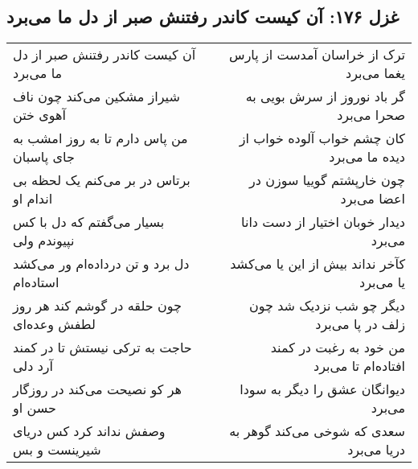 \begin{center}
\section*{غزل ۱۷۶: آن کیست کاندر رفتنش صبر از دل ما می‌برد}
\label{sec:176}
\begin{longtable}{l p{0.5cm} r}
آن کیست کاندر رفتنش صبر از دل ما می‌برد
&&
ترک از خراسان آمدست از پارس یغما می‌برد
\\
شیراز مشکین می‌کند چون ناف آهوی ختن
&&
گر باد نوروز از سرش بویی به صحرا می‌برد
\\
من پاس دارم تا به روز امشب به جای پاسبان
&&
کان چشم خواب آلوده خواب از دیده ما می‌برد
\\
برتاس در بر می‌کنم یک لحظه بی اندام او
&&
چون خارپشتم گوییا سوزن در اعضا می‌برد
\\
بسیار می‌گفتم که دل با کس نپیوندم ولی
&&
دیدار خوبان اختیار از دست دانا می‌برد
\\
دل برد و تن درداده‌ام ور می‌کشد استاده‌ام
&&
کآخر نداند بیش از این یا می‌کشد یا می‌برد
\\
چون حلقه در گوشم کند هر روز لطفش وعده‌ای
&&
دیگر چو شب نزدیک شد چون زلف در پا می‌برد
\\
حاجت به ترکی نیستش تا در کمند آرد دلی
&&
من خود به رغبت در کمند افتاده‌ام تا می‌برد
\\
هر کو نصیحت می‌کند در روزگار حسن او
&&
دیوانگان عشق را دیگر به سودا می‌برد
\\
وصفش نداند کرد کس دریای شیرینست و بس
&&
سعدی که شوخی می‌کند گوهر به دریا می‌برد
\\
\end{longtable}
\end{center}
